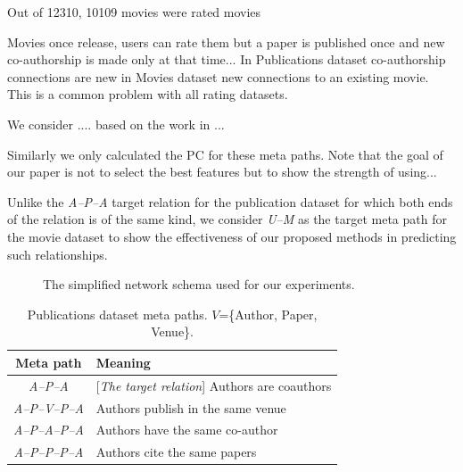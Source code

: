 Out of 12310, 10109 movies were rated movies

Movies once release, users can rate them but a paper is published once and new co-authorship is made only at that time... In Publications dataset co-authorship connections are new in Movies dataset new connections to an existing movie. This is a common problem with all rating datasets.

We consider .... based on the work in ... 

Similarly we only calculated the PC for these meta paths. Note that the goal of our paper is not to select the best features but to show the strength of using...

Unlike the \textit{A--P--A} target relation for the publication dataset for which both ends of the relation is of the same kind, we consider \textit{U--M} as the target meta path for the movie dataset to show the effectiveness of our proposed methods in predicting such relationships.


\begin{figure}[t]
\centering
{}
\caption{The simplified network schema used for our experiments.} \label{Fig:expSchema}
\end{figure}


\begin{table}[t]
\centering
\caption{Publications dataset meta paths. $V$=\{Author, Paper, Venue\}.}
\label{table_publications}\scriptsize
\begin{tabular}{|c|l|} \hline
\textbf{Meta path} & \textbf{Meaning} \\ \hline

\textit{A--P--A} & [\textit{The target relation}] Authors are coauthors \\ \hline
\textit{A--P--V--P--A} & Authors publish in the same venue \\ \hline
\textit{A--P--A--P--A} & Authors have the same co-author \\ \hline
\textit{A--P--P--P--A} & Authors cite the same papers \\ \hline

\end{tabular}

\end{table}


